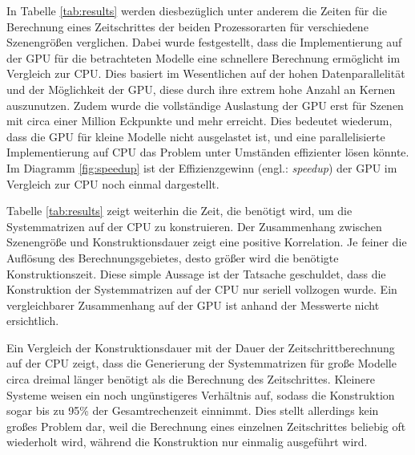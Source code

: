 \documentclass{article}
\begin{document}
    In Tabelle \ref{tab:results} werden diesbezüglich unter anderem die Zeiten für die Berechnung eines Zeitschrittes der beiden Prozessorarten für verschiedene Szenengrößen verglichen.
    Dabei wurde festgestellt, dass die Implementierung auf der GPU für die betrachteten Modelle eine schnellere Berechnung ermöglicht im Vergleich zur CPU.
    Dies basiert im Wesentlichen auf der hohen Datenparallelität und der Möglichkeit der GPU, diese durch ihre extrem hohe Anzahl an Kernen auszunutzen.
    Zudem wurde die vollständige Auslastung der GPU erst für Szenen mit circa einer Million Eckpunkte und mehr erreicht.
    Dies bedeutet wiederum, dass die GPU für kleine Modelle nicht ausgelastet ist, und eine parallelisierte Implementierung auf CPU das Problem unter Umständen effizienter lösen könnte.
    Im Diagramm \ref{fig:speedup} ist der Effizienzgewinn (engl.: \textit{speedup}) der GPU im Vergleich zur CPU noch einmal dargestellt.

    Tabelle \ref{tab:results} zeigt weiterhin die Zeit, die benötigt wird, um die Systemmatrizen auf der CPU zu konstruieren.
    Der Zusammenhang zwischen Szenengröße und Konstruktionsdauer zeigt eine positive Korrelation.
    Je feiner die Auflösung des Berechnungsgebietes, desto größer wird die benötigte Konstruktionszeit.
    Diese simple Aussage ist der Tatsache geschuldet, dass die Konstruktion der Systemmatrizen auf der CPU nur seriell vollzogen wurde.
    Ein vergleichbarer Zusammenhang auf der GPU ist anhand der Messwerte nicht ersichtlich.

    Ein Vergleich der Konstruktionsdauer mit der Dauer der Zeitschrittberechnung auf der CPU zeigt, dass die Generierung der Systemmatrizen für große Modelle circa dreimal länger benötigt als die Berechnung des Zeitschrittes.
    Kleinere Systeme weisen ein noch ungünstigeres Verhältnis auf, sodass die Konstruktion sogar bis zu 95\% der Gesamtrechenzeit einnimmt.
    Dies stellt allerdings kein großes Problem dar, weil die Berechnung eines einzelnen Zeitschrittes beliebig oft wiederholt wird, während die Konstruktion nur einmalig ausgeführt wird.
\end{document}
